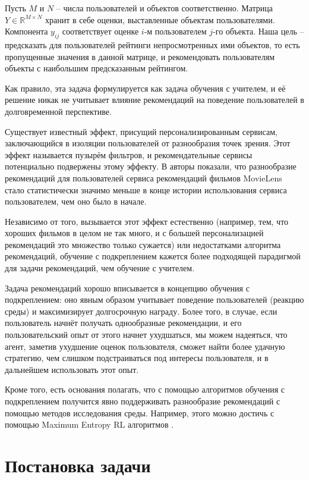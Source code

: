 \documentclass[a4paper, 12pt]{article}
\begin{document}
Пусть $M$ и $N$ -- числа пользователей и объектов соответственно.
Матрица $Y \in \mathbb{R}^{M \times N}$ хранит в себе оценки, выставленные объектам пользователями.  Компонента $y_{ij}$ соответствует оценке $i$-м пользователем $j$-го объекта. Наша цель -- предсказать для пользователей рейтинги непросмотренных ими объектов, то есть пропущенные значения в данной матрице, и рекомендовать пользователям объекты с наибольшим предсказанным рейтингом.

Как правило, эта задача формулируется как задача обучения с учителем, и её решение никак не учитывает влияние рекомендаций на поведение пользователей в долговременной перспективе. 

Существует известный эффект, присущий персонализированным сервисам, заключающийся в изоляции пользователей от разнообразия точек зрения.
Этот эффект называется пузырём фильтров, и рекомендательные сервисы потенциально подвержены этому эффекту. В \cite{filter_bubble} авторы показали, что разнообразие рекомендаций для пользователей сервиса рекомендаций фильмов MovieLens стало статистически значимо меньше в конце истории использования сервиса пользователем, чем оно было в начале.


Независимо от того, вызывается этот эффект естественно (например, тем, что хороших фильмов в целом не так много, и с большей персонализацией рекомендаций это множество только сужается) или недостатками алгоритма рекомендаций, обучение с подкреплением кажется более подходящей парадигмой для задачи рекомендаций, чем обучение с учителем.

Задача рекомендаций хорошо вписывается в концепцию обучения с подкреплением: оно явным образом учитывает поведение пользователей (реакцию среды) и максимизирует долгосрочную награду. Более того, в случае, если пользователь начнёт получать однообразные рекомендации, и его пользовательский опыт от этого начнет ухудшаться, мы можем надеяться, что агент, заметив ухудшение оценок пользователя, сможет найти более удачную стратегию, чем слишком подстраиваться под интересы пользователя, и в дальнейшем использовать этот опыт.

Кроме того, есть основания полагать, что с помощью алгоритмов обучения с подкреплением получится явно поддерживать разнообразие рекомендаций с помощью методов исследования среды. Например, этого можно достичь с помощью Maximum Entropy RL алгоритмов \cite{softq, sac}. 

\section{Постановка задачи}
\end{document}
